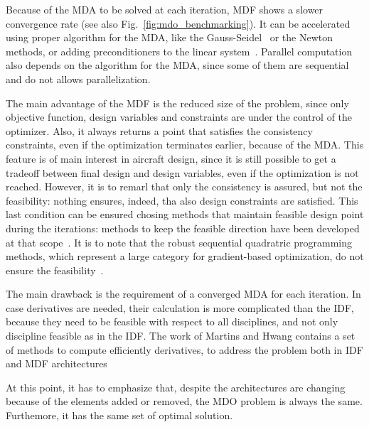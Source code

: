 Because of the MDA to be solved at each iteration, MDF shows a slower convergence rate (see also Fig.~\ref{fig:mdo_benchmarking}). 
It can be accelerated using proper algorithm for the MDA, like the Gauss-Seidel~\cite{bib:bloebaum} or the Newton~\cite{bib:kennedy} methods, or adding preconditioners to the linear system~\cite{bib:leveque_partial_equation}. 
Parallel computation also depends on the algorithm for the MDA, since some of them are sequential and do not allows parallelization. 

The main advantage of the MDF is the reduced size of the problem, since only objective function, design variables and constraints are under the control of the optimizer. 
Also, it always returns a point that satisfies the consistency constraints, even if the optimization terminates earlier, because of the MDA.
This feature is of main interest in aircraft design, since it is still possible to get a tradeoff between final design and design variables, even if the optimization is not reached. 
However, it is to remarl that only the consistency is assured, but not the feasibility: nothing ensures, indeed, tha also design constraints are satisfied. 
This last condition can be ensured chosing methods that maintain feasible design point during the iterations: methods to keep the feasible direction have been developed at that scope~\cite{bib:vanderplaats}. 
It is to note that the robust sequential quadratric programming methods, which represent a large category for gradient-based optimization, do not ensure the feasibility~\cite{bib:snopt, bib:slsqp}. 

The main drawback is the requirement of a converged MDA for each iteration. 
In case derivatives are needed, their calculation is more complicated than the IDF, because they need to be feasible with respect to all disciplines, and not only discipline feasible as in the IDF. 
The work of Martins and Hwang contains a set of methods to compute efficiently derivatives, to address the problem both in IDF and MDF architectures~\cite{bib:hwang_unif}

At this point, it has to emphasize that, despite the architectures are changing because of the elements added or removed, the MDO problem is always the same. 
Furthemore, it has the same set of optimal solution. 

